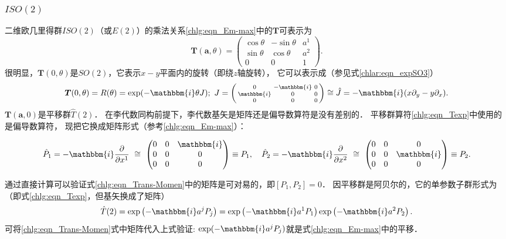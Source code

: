 \subsubsection{$ISO(2)$}\label{chlg:sec_e2}
二维欧几里得群$ISO(2)$（或$E(2)$）的乘法关系\eqref{chlg:eqn_Em-max}中的$\boldsymbol{T}$可表示为
\begin{equation}
    \boldsymbol{T}( \boldsymbol{a}, \theta ) =  \begin{pmatrix}
        {\cos \theta }&{ - \sin \theta }& a^1 \\
        {\sin \theta }&{\cos \theta }& a^2 \\
        0&0&1
    \end{pmatrix} .
\end{equation}
很明显，$\boldsymbol{T}( 0, \theta )$是$SO(2)$，它表示$x-y$平面内的旋转（即绕$z$轴旋转），
它可以表示成（参见式\eqref{chlar:eqn_expSO3}）
\begin{equation}\label{chlg:eqn_tmpR}
    \boldsymbol{T}( 0, \theta )= R(\theta ) =\exp(-\mathbbm{i} \theta J); \
    J = \left(\begin{smallmatrix}
        0 & -\mathbbm{i} & 0 \\
        \mathbbm{i} & 0 & 0 \\
        0 & 0 & 0
    \end{smallmatrix} \right)\cong
    \hat{J} = -\mathbbm{i} (x \partial_y - y \partial_x ).
\end{equation}
$\boldsymbol{T}( \boldsymbol{a}, 0 )$是平移群$\hat{T}(2)$．
在李代数同构前提下，李代数基矢是矩阵还是偏导数算符是没有差别的．
平移群算符\eqref{chlg:eqn_Texp}中使用的是偏导数算符，
现把它换成矩阵形式（参考\eqref{chlg:eqn_Em-max}）：
\begin{small}
\begin{equation}\label{chlg:eqn_Trans-Momen}
    \hat{P}_1 = -\mathbbm{i}\frac{\partial }{\partial x^1}  \ \cong \  
    \begin{pmatrix}
        0 & 0 & \mathbbm{i} \\
        0 & 0 & 0 \\
        0 & 0 & 0
    \end{pmatrix}\equiv P_1,\quad
    \hat{P}_2 = -\mathbbm{i}\frac{\partial }{\partial x^2}  \ \cong \  
    \begin{pmatrix}
        0 & 0 & 0 \\
        0 & 0 & \mathbbm{i} \\
        0 & 0 & 0
    \end{pmatrix} \equiv P_2.
\end{equation}
\end{small}
通过直接计算可以验证式\eqref{chlg:eqn_Trans-Momen}中的矩阵是可对易的，即$[P_1,P_2]=0$．
因平移群是阿贝尔的，它的单参数子群形式为（即式\eqref{chlg:eqn_Texp}，但基矢换成了矩阵）
\begin{equation}
    \hat{T}(2) = \exp\left( -\mathbbm{i} a^j P_j \right) 
    = \exp\left(-\mathbbm{i} a^1 P_1  \right)  \exp\left(-\mathbbm{i} a^2 P_2 \right)  .
\end{equation}
可将\eqref{chlg:eqn_Trans-Momen}式中矩阵代入上式验证:
$\exp(-\mathbbm{i} a^j P_j)$就是式\eqref{chlg:eqn_Em-max}中的平移．

